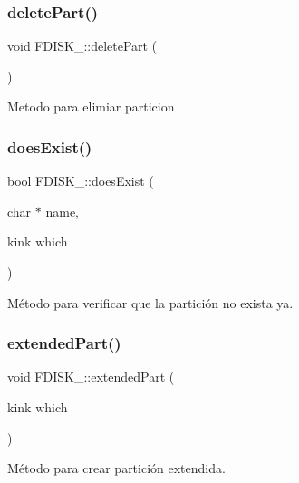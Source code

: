 \subsubsection{\texorpdfstring{delete\+Part()}{deletePart()}}
{\footnotesize\ttfamily void F\+D\+I\+S\+K\+\_\+\+::delete\+Part (\begin{DoxyParamCaption}{ }\end{DoxyParamCaption})\hspace{0.3cm}{\ttfamily [inline]}}

Metodo para elimiar particion \mbox{\label{classFDISK___a93bf6bebd83704cc477d365c52e78cca}} 
\subsubsection{\texorpdfstring{does\+Exist()}{doesExist()}}
{\footnotesize\ttfamily bool F\+D\+I\+S\+K\+\_\+\+::does\+Exist (\begin{DoxyParamCaption}\item[{char $\ast$}]{name,  }\item[{kink}]{which }\end{DoxyParamCaption})\hspace{0.3cm}{\ttfamily [inline]}}

Método para verificar que la partición no exista ya. \mbox{\label{classFDISK___a03f9fa267b7bdf7b2dda3aa13cfc960d}} 
\subsubsection{\texorpdfstring{extended\+Part()}{extendedPart()}}
{\footnotesize\ttfamily void F\+D\+I\+S\+K\+\_\+\+::extended\+Part (\begin{DoxyParamCaption}\item[{kink}]{which }\end{DoxyParamCaption})\hspace{0.3cm}{\ttfamily [inline]}}

Método para crear partición extendida. \mbox{\label{classFDISK___af29e537ad425951e4c4379f812d18a21}} 
